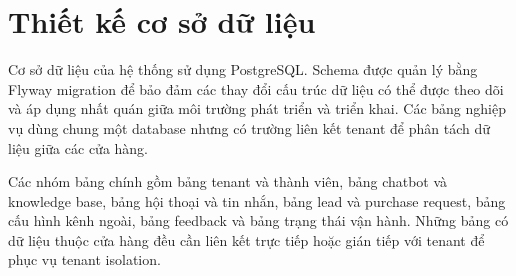\documentclass[../DoAn.tex]{subfiles}
\begin{document}

\section{Thiết kế cơ sở dữ liệu}

Cơ sở dữ liệu của hệ thống sử dụng PostgreSQL. Schema được quản lý bằng Flyway migration để bảo đảm các thay đổi cấu trúc dữ liệu có thể được theo dõi và áp dụng nhất quán giữa môi trường phát triển và triển khai. Các bảng nghiệp vụ dùng chung một database nhưng có trường liên kết tenant để phân tách dữ liệu giữa các cửa hàng.

Các nhóm bảng chính gồm bảng tenant và thành viên, bảng chatbot và knowledge base, bảng hội thoại và tin nhắn, bảng lead và purchase request, bảng cấu hình kênh ngoài, bảng feedback và bảng trạng thái vận hành. Những bảng có dữ liệu thuộc cửa hàng đều cần liên kết trực tiếp hoặc gián tiếp với tenant để phục vụ tenant isolation.

%
\end{document}
